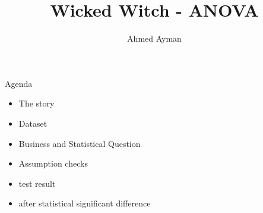 \documentclass[8pt]{beamer}
\title{Wicked Witch - ANOVA}
\author{Ahmed Ayman}
\begin{document}
        \maketitle
        \begin{frame}{Agenda}
            \begin{itemize}
                \item The story
                \item Dataset
                \item Business and Statistical Question
                \item Assumption checks
                \item test result
                \item after statistical significant difference
            \end{itemize}
        \end{frame}
\end{document}
